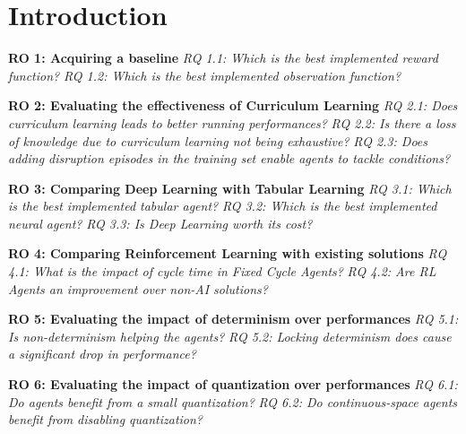 \chapter{Introduction}
\label{chapter:introduction}

\hfill \break
\noindent
\textbf{\hypertarget{ro1}{RO 1}: Acquiring a baseline}
\hfill \break
\textit{\hypertarget{rq1.1}{RQ 1.1}: Which is the best implemented reward function?}
\hfill \break
\textit{\hypertarget{rq1.2}{RQ 1.2}: Which is the best implemented observation function?}

\hfill \break
\noindent
\textbf{\hypertarget{ro2}{RO 2}: Evaluating the effectiveness of Curriculum Learning}
\hfill \break
\textit{\hypertarget{rq2.1}{RQ 2.1}: Does curriculum learning leads to better running performances?}
\hfill \break
\textit{\hypertarget{rq2.2}{RQ 2.2}: Is there a loss of knowledge due to curriculum learning not being exhaustive?}
\hfill \break
\textit{\hypertarget{rq2.3}{RQ 2.3}: Does adding disruption episodes in the training set enable agents to tackle conditions?}

\hfill \break
\noindent
\textbf{\hypertarget{ro3}{RO 3}: Comparing Deep Learning with Tabular Learning}
\hfill \break
\textit{\hypertarget{rq3.1}{RQ 3.1}: Which is the best implemented tabular agent?}
\hfill \break
\textit{\hypertarget{rq3.2}{RQ 3.2}: Which is the best implemented neural agent?}
\hfill \break
\textit{\hypertarget{rq3.3}{RQ 3.3}: Is Deep Learning worth its cost?}

\hfill \break
\noindent
\textbf{\hypertarget{ro4}{RO 4}: Comparing Reinforcement Learning with existing solutions}
\hfill \break
\textit{\hypertarget{rq4.1}{RQ 4.1}: What is the impact of cycle time in Fixed Cycle Agents?}
\hfill \break
\textit{\hypertarget{rq4.2}{RQ 4.2}: Are RL Agents an improvement over non-AI solutions?}

\hfill \break
\noindent
\textbf{\hypertarget{ro5}{RO 5}: Evaluating the impact of determinism over performances}
\hfill \break
\textit{\hypertarget{rq5.1}{RQ 5.1}: Is non-determinism helping the agents?}
\hfill \break
\textit{\hypertarget{rq5.2}{RQ 5.2}: Locking determinism does cause a significant drop in performance?}

\hfill \break
\noindent
\textbf{\hypertarget{ro6}{RO 6}: Evaluating the impact of quantization over performances}
\hfill \break
\textit{\hypertarget{rq6.1}{RQ 6.1}: Do agents benefit from a small quantization?}
\hfill \break
\textit{\hypertarget{rq6.2}{RQ 6.2}: Do continuous-space agents benefit from disabling quantization?}


